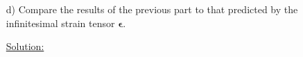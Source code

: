 \documentclass{article}
\newcommand{\bs}{\boldsymbol}
\newif\ifsolution
\begin{document}
\begin{enumerate}
\ifsolution
\underline{Solution:}

For $k = 1$:
\begin{align}
\left|\frac{ds_1}{dS_1}\right| &= \sqrt{\frac{(1+k)^2+1}{2}} = \sqrt{\frac{5}{2}} = 1.581, \\
\left|\frac{ds_2}{dS_2}\right| &= \sqrt{\frac{(1+k)^2+1}{2}} = \sqrt{\frac{5}{2}} = 1.581,
\end{align}
and:
\begin{align}
ds_1ds_2\cos \theta &= \frac{dS_1dS_2}{2}(-(1+k)^2+1) = -\frac{3 dS_1dS_2}{2}, \\
\cos\theta &= -0.6.
\end{align}
For $k = 0.01$:
\begin{align}
\left|\frac{ds_1}{dS_1}\right| &= \sqrt{\frac{(1+k)^2+1}{2}} = 1.005, \\
\left|\frac{ds_2}{dS_2}\right| &= \sqrt{\frac{(1+k)^2+1}{2}} = 1.005.
\end{align}
and:
\begin{align}
ds_1 ds_2 \cos \theta &= \frac{dS_1dS_2}{2}(-(1+k)^2+1) = -\frac{3 dS_1dS_2}{2} \\
\cos\theta &= -0.00995
\end{align}
\fi
\item[d)] Compare the results of the previous part to that predicted by the infinitesimal  strain tensor
$\bs{\epsilon}$.

\ifsolution
\underline{Solution:}


\end{enumerate}
\end{document}

